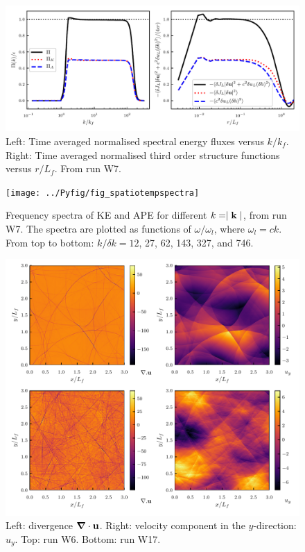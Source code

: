 \documentclass{jfm}
\providecommand\bnabla{\boldsymbol{\nabla}}
\begin{document}
\begin{figure}
\centerline{\includegraphics[width=5.8in]{../Pyfig/fig_flux_struct_combined}}
\caption{Left: Time averaged normalised spectral energy fluxes versus $ k/k_f
$. Right: Time averaged normalised third order structure functions versus $
r/L_f $. From run W7. }
\label{Flux}
\end{figure}


\begin{figure}
\centerline{\texttt{[image: ../Pyfig/fig\_spatiotempspectra]}}
\caption{Frequency spectra of KE and APE for different $ k = \mid {\bf k} \mid
$, from run W7. The spectra are plotted as functions of $\omega/\omega_l$,
where $\omega_l = c k$. From top to bottom: $ k /\delta k = 12$, 27, 62, 143,
327, and 746. }
\label{fig_spatiotemp_spectra}
\end{figure}

\begin{figure}
\centerline{\includegraphics[width=6.0in]{../Pyfig/fig_phys_fields_wave}}
\caption{Left: divergence $ \bnabla \cdot {\bf u} $. Right: velocity component in the $ y $-direction: $ u_y $. Top: run W6. Bottom: run W17.  }
\label{Physical}
\end{figure}
\end{document}
